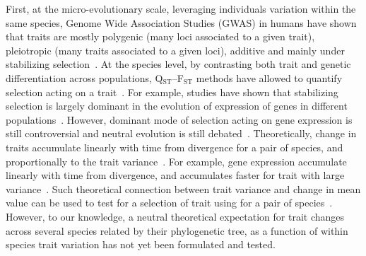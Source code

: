\documentclass{article}
\begin{document}
First, at the micro-evolutionary scale, leveraging individuals variation within the same species, Genome Wide Association Studies (GWAS) in humans have shown that traits are mostly polygenic (many loci associated to a given trait), pleiotropic (many traits associated to a given loci), additive and mainly under stabilizing selection~\cite{simons_population_2018, sella_thinking_2019}.
At the species level, by contrasting both trait and genetic differentiation across populations, Q$_\text{ST}$--F$_\text{ST}$ methods have allowed to quantify selection acting on a trait~\cite{martin_multivariate_2008, leinonen_qst_2013}.
For example, studies have shown that stabilizing selection is largely dominant in the evolution of expression of genes in different populations~\cite{whitehead_neutral_2006, gilad_natural_2006}.
However, dominant mode of selection acting on gene expression is still controversial and neutral evolution is still debated~\cite{signor_evolution_2018, price_detecting_2022}.
Theoretically, change in traits accumulate linearly with time from divergence for a pair of species, and proportionally to the trait variance~\cite{lande_genetic_1980, turelli_heritable_1984}.
For example, gene expression accumulate linearly with time from divergence, and accumulates faster for trait with large variance~\cite{khaitovich_neutral_2004}.
Such theoretical connection between trait variance and change in mean value can be used to test for a selection of trait using for a pair of species~\cite{walsh_evolution_2018}.
However, to our knowledge, a neutral theoretical expectation for trait changes across several species related by their phylogenetic tree, as a function of within species trait variation has not yet been formulated and tested.
\end{document}
